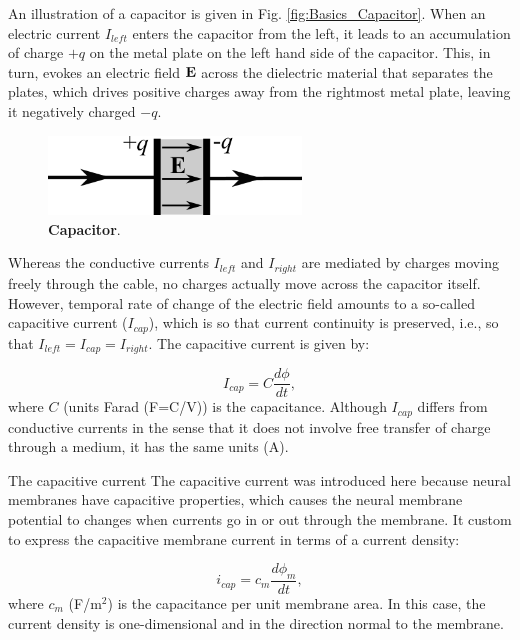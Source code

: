 An illustration of a capacitor is given in Fig. \ref{fig:Basics_Capacitor}. When an electric current $I_{left}$ enters the capacitor from the left, it leads to an accumulation of charge $+q$ on the metal plate on the left hand side of the capacitor. This, in turn, evokes an electric field $\bf E$ across the dielectric material that separates the plates, which drives positive charges away from the rightmost metal plate, leaving it negatively charged $-q$. 

\begin{figure}[!ht]
\begin{center}
\includegraphics[width=0.6\textwidth]{Figures/Basics/Capacitor.png}
\end{center}
\caption{{\bf Capacitor}.  
}
\label{fig:Basics:Capacitor}
\end{figure}

Whereas the conductive currents $I_{left}$ and $I_{right}$ are mediated by charges moving freely through the cable, no charges actually move across the capacitor itself. However, temporal rate of change of the electric field amounts to a so-called capacitive current  ($I_{cap}$), which is so that current continuity is preserved, i.e., so that $I_{left} = I_{cap} = I_{right}$. The capacitive current is given by: 

\begin{equation}
I_{cap} = C\frac{d\phi}{dt}, 
\label{eq:Basics:Icap}
\end{equation}
where $C$ (units Farad (F=C/V)) is the capacitance. Although $I_{cap}$ differs from conductive currents in the sense that it does not involve free transfer of charge through a medium, it has the same units (A). 

The capacitive current
The capacitive current was introduced here because neural membranes have capacitive properties, which causes the neural membrane potential to changes when currents go in or out through the membrane. It custom to express the capacitive membrane current in terms of a current density: 

\begin{equation}
i_{cap} = c_m\frac{d\phi_m}{dt}, 
\label{eq:Basics:Icap_mem}
\end{equation}
where $c_m$ (F/m$^2$) is the capacitance per unit membrane area. In this case, the current density is one-dimensional and in the direction normal to the membrane.


